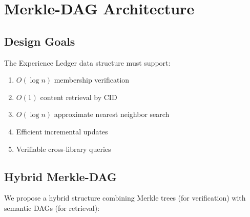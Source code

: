 \documentclass[11pt,letterpaper]{article}
\begin{document}
\section{Merkle-DAG Architecture}
\label{sec:merkle}

\subsection{Design Goals}

The Experience Ledger data structure must support:

\begin{enumerate}
    \item $O(\log n)$ membership verification
    \item $O(1)$ content retrieval by CID
    \item $O(\log n)$ approximate nearest neighbor search
    \item Efficient incremental updates
    \item Verifiable cross-library queries
\end{enumerate}

\subsection{Hybrid Merkle-DAG}

We propose a hybrid structure combining Merkle trees (for verification) with semantic DAGs (for retrieval):
\end{document}
